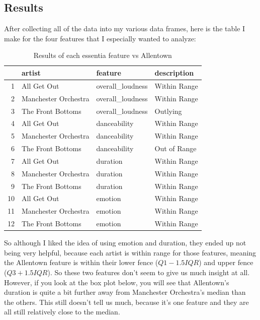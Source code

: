 \documentclass{article}\usepackage[]{graphicx}\usepackage[]{xcolor}
\begin{document}
\begin{multicols}{2}
\section{Results}
After collecting all of the data into my various data frames, here is the table I make for the four features that I especially wanted to analyze:
\begin{table}[H]
\centering
\begin{tabular}{rlll}
  \hline
 & artist & feature & description \\ 
  \hline
1 & All Get Out & overall\_loudness & Within Range \\ 
  2 & Manchester Orchestra & overall\_loudness & Within Range \\ 
  3 & The Front Bottoms & overall\_loudness & Outlying \\ 
  4 & All Get Out & danceability & Within Range \\ 
  5 & Manchester Orchestra & danceability & Within Range \\ 
  6 & The Front Bottoms & danceability & Out of Range \\ 
  7 & All Get Out & duration & Within Range \\ 
  8 & Manchester Orchestra & duration & Within Range \\ 
  9 & The Front Bottoms & duration & Within Range \\ 
  10 & All Get Out & emotion & Within Range \\ 
  11 & Manchester Orchestra & emotion & Within Range \\ 
  12 & The Front Bottoms & emotion & Within Range \\ 
   \hline
\end{tabular}
\caption{Results of each essentia feature vs Allentown} 
\label{range_results:reference}
\end{table}
So although I liked the idea of using emotion and duration, they ended up not being very helpful, because each artist is within range for those features, meaning the Allentown feature is within their lower fence ($Q1 - 1.5IQR$) and upper fence ($Q3 + 1.5IQR$). So these two features don't seem to give us much insight at all. However, if you look at the box plot below, you will see that Allentown's duration is quite a bit further away from Manchester Orchestra's median than the others. This still doesn't tell us much, because it's one feature and they are all still relatively close to the median. \\


\end{multicols}
\end{document}
